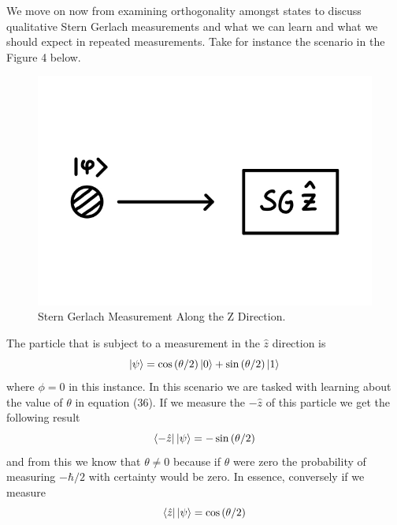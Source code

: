 \documentclass[twocolumn]{article}
\begin{document}
We move on now from examining orthogonality amongst states to discuss qualitative Stern Gerlach measurements and what we can learn and what we should expect in repeated measurements. Take for instance the scenario in the Figure 4 below.
\begin{figure}[htpb]
\begin{center}
\includegraphics[width=0.70\linewidth]{SG-Measurement-Z-One-Time.PNG}
\caption{Stern Gerlach Measurement Along the Z Direction.}
\end{center}
\end{figure}
The particle that is subject to a measurement in the $\hat{z}$ direction is
\begin{equation}
\ket{\psi}=\cos{(\theta/2)}\ket{0}+\sin{(\theta/2)}\ket{1}
\end{equation}
where $\phi=0$ in this instance. In this scenario we are tasked with learning about the value of $\theta$ in equation (36). If we measure the $-\hat{z}$ of this particle we get the following result
\begin{equation}
\bra{-\hat{z}}\ket{\psi}=-\sin{(\theta/2)}
\end{equation}
and from this we know that $\theta \neq 0$ because if $\theta$ were zero the probability of measuring $-\hbar/2$ with certainty would be zero. In essence, conversely if we measure 
\begin{equation}
\bra{\hat{z}}\ket{\psi}=\cos{(\theta/2)}
\end{equation}
\end{document}
